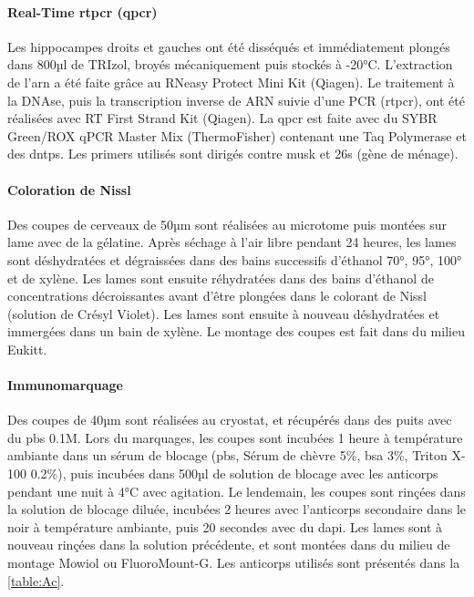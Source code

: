 \paragraph{Real-Time \acrshort{rtpcr} (\acrshort{qpcr})}
\label{sec:qPCR}
	Les hippocampes droits et gauches ont été disséqués et immédiatement plongés dans 800µl de TRIzol\textregistered, broyés mécaniquement puis stockés à -20°C. L'extraction de l'\acrshort{arn} a été faite grâce au RNeasy Protect Mini Kit (Qiagen\textregistered). Le traitement à la DNAse, puis la transcription inverse de ARN suivie d'une PCR (\acrshort{rtpcr}), ont été réalisées avec RT First Strand Kit (Qiagen\textregistered). La \gls{qpcr} est faite avec du SYBR Green/ROX qPCR Master Mix (ThermoFisher\textregistered) contenant une Taq Polymerase et des \glspl{dntp}. Les primers utilisés sont dirigés contre \gls{musk} et \acrshort{26s} (gène de ménage).
	
\paragraph{Coloration de Nissl}
\label{sec:Nissl}
	Des coupes de cerveaux de 50µm sont réalisées au microtome puis montées sur lame avec de la gélatine. Après séchage à l'air libre pendant 24 heures, les lames sont déshydratées et dégraissées dans des bains successifs d'éthanol 70°, 95°, 100° et de xylène. Les lames sont ensuite réhydratées dans des bains d'éthanol de concentrations décroissantes avant d'être plongées dans le colorant de Nissl (solution de Crésyl Violet).  Les lames sont ensuite  à nouveau déshydratées et immergées dans un bain de xylène. Le montage des coupes est fait dans du milieu Eukitt\textregistered.
	
\paragraph{Immunomarquage}	
\label{sec:immunomarquage}
	Des coupes de 40µm sont réalisées au cryostat, et récupérés dans des puits avec du \acrshort{pbs} 0.1M. Lors du marquages, les coupes sont incubées 1 heure à température ambiante dans un sérum de blocage (\acrshort{pbs}, Sérum de chèvre 5\%, \acrshort{bsa} 3\%, Triton X-100 0.2\%), puis  incubées dans 500µl de solution de blocage avec les anticorps pendant une nuit à 4°C avec agitation. Le lendemain, les coupes sont rinçées dans la solution de blocage diluée, incubées 2 heures avec l'anticorps secondaire dans le noir à température ambiante, puis 20 secondes avec du \gls{dapi}. Les lames sont à nouveau rinçées dans la solution précédente, et sont montées dans du milieu de montage Mowiol ou FluoroMount-G\textregistered.
	Les anticorps utilisés sont présentés dans la \cref{table:Ac}.

